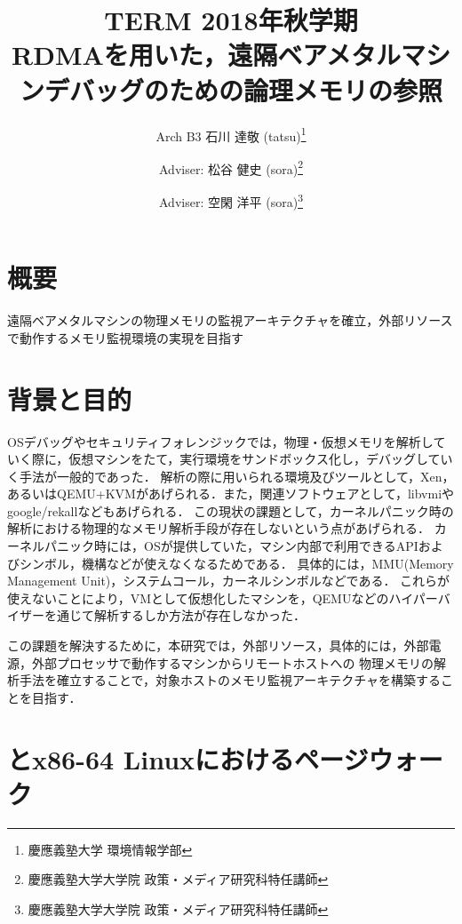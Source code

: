 \documentclass[a4j,10pt]{jsarticle}
\begin{document}

    \title{
        TERM 2018年秋学期 \\
        RDMAを用いた，遠隔ベアメタルマシンデバッグのための論理メモリの参照
    }

    \author{
        Arch B3 石川 達敬 (tatsu)\thanks{慶應義塾大学 環境情報学部}
        \and
        Adviser: 松谷 健史 (sora)\thanks{慶應義塾大学大学院 政策・メディア研究科特任講師}
        \and
        Adviser: 空閑 洋平 (sora)\thanks{慶應義塾大学大学院 政策・メディア研究科特任講師}
    }

    \maketitle

    \section{概要}

    遠隔ベアメタルマシンの物理メモリの監視アーキテクチャを確立，外部リソースで動作するメモリ監視環境の実現を目指す

    \section{背景と目的}

    OSデバッグやセキュリティフォレンジックでは，物理・仮想メモリを解析していく際に，仮想マシンをたて，実行環境をサンドボックス化し，デバッグしていく手法が一般的であった．
    解析の際に用いられる環境及びツールとして，Xen，あるいはQEMU+KVMがあげられる．また，関連ソフトウェアとして，libvmi\cite{libvmi}やgoogle/rekallなどもあげられる．
    この現状の課題として，カーネルパニック時の解析における物理的なメモリ解析手段が存在しないという点があげられる．
    カーネルパニック時には，OSが提供していた，マシン内部で利用できるAPIおよびシンボル，機構などが使えなくなるためである．
    具体的には，MMU(Memory Management Unit)，システムコール，カーネルシンボルなどである．
    これらが使えないことにより，VMとして仮想化したマシンを，QEMUなどのハイパーバイザーを通じて解析するしか方法が存在しなかった．

    この課題を解決するために，本研究では，外部リソース，具体的には，外部電源，外部プロセッサで動作するマシンからリモートホストへの
    物理メモリの解析手法を確立することで，対象ホストのメモリ監視アーキテクチャを構築することを目指す．

    \section{とx86-64 Linuxにおけるページウォーク}
\end{document}

